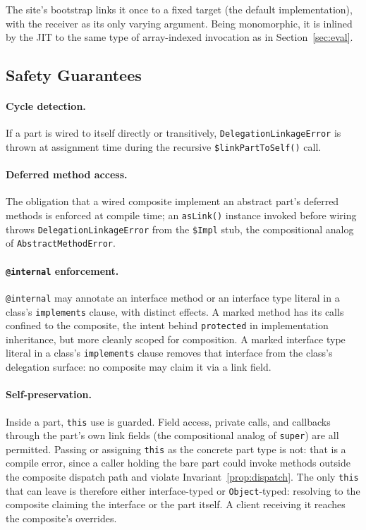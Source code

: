 \documentclass[sigplan,10pt,review,anonymous]{acmart}
\theoremstyle{acmplain}
\newcommand{\code}[1]{\texttt{#1}}
\begin{document}
The site's bootstrap links it once to a fixed target (the default implementation),
with the receiver as its only varying argument. Being
monomorphic, it is inlined by the JIT to the same type of array-indexed
invocation as in Section~\ref{sec:eval}.

\subsection{Safety Guarantees}

\paragraph{Cycle detection.}
If a part is wired to itself directly or transitively,
\code{De\-le\-ga\-tion\-Link\-age\-Er\-ror} is thrown at assignment time during
the recursive \code{\$linkPartToSelf()} call.

\paragraph{Deferred method access.}
The obligation that a wired composite implement an abstract part's deferred methods is enforced at compile time; an \code{asLink()} instance invoked before wiring throws \code{DelegationLinkageError} from the \code{\$Impl} stub, the compositional analog of \code{AbstractMethodError}.

\paragraph{\code{@internal} enforcement.}
\code{@internal} may annotate an interface method or an interface type literal
in a class's \code{implements} clause, with distinct effects. A marked method has its calls confined to the composite, the intent behind \code{protected} in implementation inheritance, but more cleanly scoped for composition. A marked
interface type literal in a class's \code{implements}
clause removes that interface from the class's delegation surface: no composite may claim it via a link field.

\paragraph{Self-preservation.}
Inside a part, \code{this} use is guarded. Field access, private calls,
and callbacks through the part's own link fields (the compositional
analog of \code{super}) are all permitted. Passing or assigning \code{this} as
the concrete part type is not: that is a compile error, since a caller
holding the bare part could invoke methods outside the composite dispatch
path and violate Invariant~\ref{prop:dispatch}. The only \code{this} that can leave is therefore either interface-typed or
\code{Object}-typed: resolving to the composite claiming the interface or the
part itself. A client receiving it reaches the composite's overrides.
\end{document}
